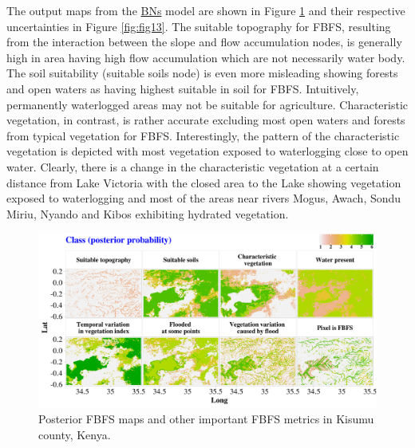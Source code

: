 \documentclass[12pt,oneside]{article}
\begin{document}
The output maps from the \href{https://en.wikipedia.org/wiki/Bayesian_network}{BNs} model are shown in Figure \ref{fig:fig12} and their respective uncertainties in Figure \ref{fig:fig13}. The suitable topography for FBFS, resulting from the interaction between the slope and flow accumulation nodes, is generally high in area having high flow accumulation which are not necessarily water body. The soil suitability (suitable soils node) is even more misleading showing forests and open waters as having highest suitable in soil for FBFS. Intuitively, permanently waterlogged areas may not be suitable for agriculture. Characteristic vegetation, in contrast, is rather accurate excluding most open waters and forests from typical vegetation for FBFS. Interestingly, the pattern of the characteristic vegetation is depicted with most vegetation exposed to waterlogging close to open water. Clearly, there is a change in the characteristic vegetation at a certain distance from Lake Victoria with the closed area to the Lake showing vegetation exposed to waterlogging and most of the areas near rivers Mogus, Awach, Sondu Miriu, Nyando and Kibos exhibiting hydrated vegetation.

\begin{figure}
\includegraphics[width=1\linewidth]{figures/Mapping_FBFS_posterior_maps} \caption{Posterior FBFS maps and other important FBFS metrics in Kisumu county, Kenya.}\label{fig:fig12}
\end{figure}
\end{document}
